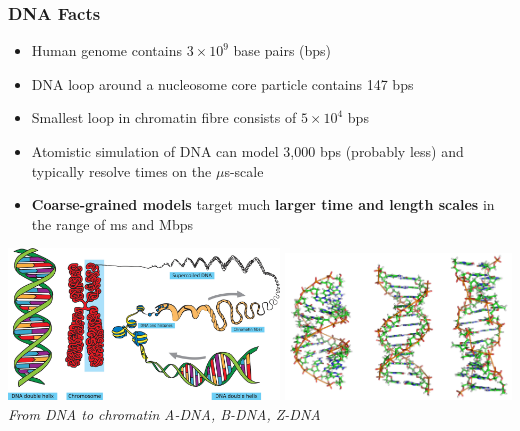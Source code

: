\documentclass[slidestop,compress,9pt]{beamer}
\begin{document}
\begin{frame}
\frametitle{DNA Facts}

\begin{itemize}
\item Human genome contains $3\times10^{9}$ base pairs (bps)
\item DNA loop around a nucleosome core particle contains 147 bps
\item Smallest loop in chromatin fibre consists of $5\times10^4$ bps
\item Atomistic simulation of DNA can model 3,000 bps (probably less) and typically resolve times on the $\mu$s-scale  
\item \textbf{Coarse-grained models} target much \textbf{larger time and length scales} in the range of ms and Mbps 
\end{itemize}

\begin{center}
\includegraphics[width=0.54\textwidth]{fromDNAtoChromatin.png}
\includegraphics[width=0.45\textwidth]{A-B-Z-DNA.png}\\
\textit{From DNA to chromatin} \hspace{2.75cm} \textit{A-DNA, B-DNA, Z-DNA}
\end{center}

\end{frame}
\end{document}
